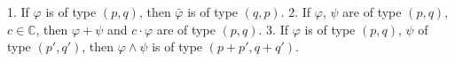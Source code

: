 1. If $\varphi$ is of type $(p, q)$, then $\bar{\varphi}$ is of type $(q, p)$.
2. If $\varphi$, $\psi$ are of type $(p, q)$, $c \in \mathbb{C}$, then $\varphi + \psi$ and $c \cdot \varphi$ are of type $(p, q)$.
3. If $\varphi$ is of type $(p, q)$, $\psi$ of type $(p', q')$, then $\varphi \wedge \psi$ is of type $(p + p', q + q')$.
